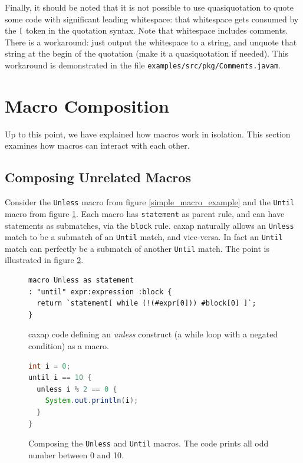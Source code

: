   Finally, it should be noted that it is not possible to use quasiquotation to
  quote some code with significant leading whitespace: that whitespace gets
  consumed by the \texttt{[} token in the quotation syntax. Note that whitespace
  includes comments. There is a workaround: just output the whitespace to a
  string, and unquote that string at the begin of the quotation (make it a
  quasiquotation if needed). This workaround is demonstrated in the file
  \texttt{examples/src/pkg/Comments.javam}.

\section{Macro Composition}

Up to this point, we have explained how macros work in isolation. This section
examines how macros can interact with each other.

\subsection{Composing Unrelated Macros}


Consider the \texttt{Unless} macro from figure \ref{simple_macro_example} and
the \texttt{Until} macro from figure \ref{until_macro}. Each macro has
\texttt{statement} as parent rule, and can have statements as submatches, via
the \texttt{block} rule. caxap naturally allows an \texttt{Unless} match to be a
submatch of an \texttt{Until} match, and vice-versa. In fact an \texttt{Until}
match can perfectly be a submatch of another \texttt{Until} match. The point is
illustrated in figure \ref{composition_example}.

\begin{figure}[here]
\small
\begin{lstlisting}[frame=single,language=caxap]
macro Unless as statement
: "until" expr:expression :block {
  return `statement[ while (!(#expr[0])) #block[0] ]`;
}
\end{lstlisting}
\caption{caxap code defining an \emph{unless} construct (a while loop with a
  negated condition) as a macro.}
\label{until_macro}
\end{figure}

\begin{figure}[here]
\small
\begin{lstlisting}[frame=single,language=Java]
int i = 0;
until i == 10 {
  unless i % 2 == 0 {
    System.out.println(i);
  }
}
\end{lstlisting}
\caption{Composing the \texttt{Unless} and \texttt{Until} macros. The code
  prints all odd number between 0 and 10.}
\label{composition_example}
\end{figure}

